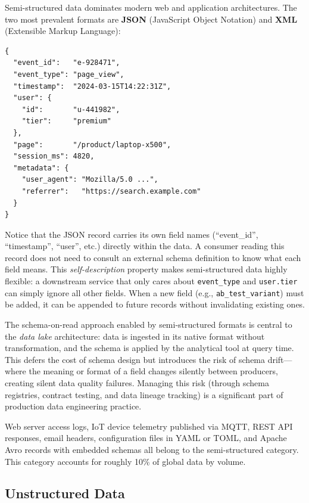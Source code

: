 Semi-structured data dominates modern web and application architectures.
The two most prevalent formats are \textbf{JSON} (JavaScript Object
Notation) and \textbf{XML} (Extensible Markup Language):

\begin{lstlisting}[style=pseudocode, caption={A JSON event record from a streaming API}]
{
  "event_id":   "e-928471",
  "event_type": "page_view",
  "timestamp":  "2024-03-15T14:22:31Z",
  "user": {
    "id":       "u-441982",
    "tier":     "premium"
  },
  "page":       "/product/laptop-x500",
  "session_ms": 4820,
  "metadata": {
    "user_agent": "Mozilla/5.0 ...",
    "referrer":   "https://search.example.com"
  }
}
\end{lstlisting}

Notice that the JSON record carries its own field names (``event\_id'',
``timestamp'', ``user'', etc.) directly within the data. A consumer
reading this record does not need to consult an external schema
definition to know what each field means. This \emph{self-description}
property makes semi-structured data highly flexible: a downstream
service that only cares about \texttt{event\_type} and
\texttt{user.tier} can simply ignore all other fields. When a new field
(e.g., \texttt{ab\_test\_variant}) must be added, it can be appended to
future records without invalidating existing ones.

The schema-on-read approach enabled by semi-structured formats is
central to the \emph{data lake} architecture: data is ingested in its
native format without transformation, and the schema is applied by the
analytical tool at query time. This defers the cost of schema design
but introduces the risk of schema drift---where the meaning or format
of a field changes silently between producers, creating silent data
quality failures. Managing this risk (through schema registries,
contract testing, and data lineage tracking) is a significant part of
production data engineering practice.

Web server access logs, IoT device telemetry published via MQTT,
REST API responses, email headers, configuration files in YAML or TOML,
and Apache Avro records with embedded schemas all belong to the
semi-structured category. This category accounts for roughly 10\% of
global data by volume.

\subsection{Unstructured Data}
\label{subsec:unstructured}

